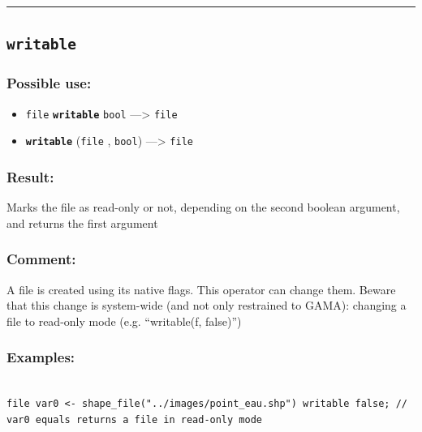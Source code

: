 \documentclass[]{book}
\providecommand{\tightlist}{%
  \setlength{\itemsep}{0pt}\setlength{\parskip}{0pt}}
\theoremstyle{definition}
\theoremstyle{definition}
\theoremstyle{definition}
\theoremstyle{remark}
\begin{document}
\begin{center}\rule{0.5\linewidth}{\linethickness}\end{center}

\subsection{\texorpdfstring{\texttt{writable}}{writable}}\label{writable}

\subsubsection{Possible use:}\label{possible-use-564}

\begin{itemize}
\tightlist
\item
  \texttt{file} \textbf{\texttt{writable}} \texttt{bool}
  ---\textgreater{} \texttt{file}
\item
  \textbf{\texttt{writable}} (\texttt{file} , \texttt{bool})
  ---\textgreater{} \texttt{file}
\end{itemize}

\subsubsection{Result:}\label{result-543}

Marks the file as read-only or not, depending on the second boolean
argument, and returns the first argument

\subsubsection{Comment:}\label{comment-113}

A file is created using its native flags. This operator can change them.
Beware that this change is system-wide (and not only restrained to
GAMA): changing a file to read-only mode (e.g. ``writable(f, false)'')

\subsubsection{Examples:}\label{examples-390}

\begin{verbatim}
 
file var0 <- shape_file("../images/point_eau.shp") writable false; // var0 equals returns a file in read-only mode
\end{verbatim}
\end{document}
